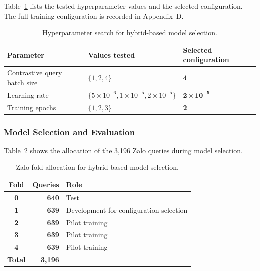 Table~\ref{tab:4.5} lists the tested hyperparameter values and the selected configuration. The full training configuration is recorded in Appendix~D.

\begin{table}[H]
\centering
\small
\setlength{\tabcolsep}{4pt}
\renewcommand{\arraystretch}{1.18}
\caption{Hyperparameter search for hybrid-based model selection.}
\label{tab:4.5}
\begin{tabular}{@{}p{5.5cm}p{5.0cm}p{4.5cm}@{}}
\toprule
\textbf{Parameter} & \textbf{Values tested} & \textbf{Selected configuration} \\
\midrule
Contrastive query batch size & \(\{1,2,4\}\) & \textbf{4} \\
Learning rate & \(\{5\times10^{-6},1\times10^{-5},2\times10^{-5}\}\) & \(\boldsymbol{2\times10^{-5}}\) \\
Training epochs & \(\{1,2,3\}\) & \textbf{2} \\
\bottomrule
\end{tabular}
\end{table}

\subsubsection{Model Selection and Evaluation}

Table~\ref{tab:hybrid-finetuning-folds} shows the allocation of the 3,196 Zalo queries during model selection.

\begin{table}[H]
\centering
\small
\renewcommand{\arraystretch}{1.18}
\caption{Zalo fold allocation for hybrid-based model selection.}
\label{tab:hybrid-finetuning-folds}
\begin{tabular}{@{}crp{8.5cm}@{}}
\toprule
\textbf{Fold} & \textbf{Queries} & \textbf{Role} \\
\midrule
\textbf{0} & \textbf{640} & Test \\
\textbf{1} & \textbf{639} & Development for configuration selection \\
\textbf{2} & \textbf{639} & Pilot training \\
\textbf{3} & \textbf{639} & Pilot training \\
\textbf{4} & \textbf{639} & Pilot training \\
\midrule
\textbf{Total} & \textbf{3,196} & \\
\bottomrule
\end{tabular}
\end{table}

